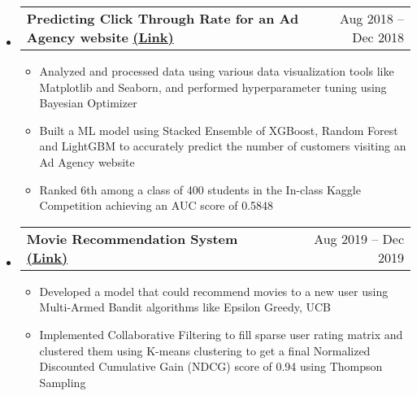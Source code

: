 \documentclass[letterpaper,12pt, margin=2in]{article}
\makeatletter
\newcommand{\resumeItem}[1]{
  \item\small{
    {#1 \vspace{-2pt}}
  }
}
\newcommand{\resumeProjectHeading}[2]{
    \item
    \begin{tabular*}{0.97\textwidth}{l@{\extracolsep{\fill}}r}
      \small#1 & #2 \\
    \end{tabular*}\vspace{-9pt}
}
\newcommand{\resumeSubHeadingListStart}{\begin{itemize}[leftmargin=0.05in, label={}]}
\newcommand{\resumeSubHeadingListEnd}{\end{itemize}}
\newcommand{\resumeItemListStart}{\begin{itemize}}
\newcommand{\resumeItemListEnd}{\end{itemize}\vspace{-8pt}}
\makeatother
\begin{document}
    \resumeSubHeadingListStart
    \resumeProjectHeading
          {\textbf{Predicting Click Through Rate for an Ad Agency website} \href{https://towardsdatascience.com/predicting-click-through-rate-for-a-website-7cd2a892d26e}{\textbf{(Link)}}}{Aug 2018 -- Dec 2018}
          \resumeItemListStart
            \resumeItem{Analyzed and processed data using various data visualization tools like Matplotlib and Seaborn, and performed hyperparameter tuning using Bayesian Optimizer}
            \resumeItem{Built a ML model using Stacked Ensemble of XGBoost, Random Forest and LightGBM to accurately predict the number of customers visiting an Ad Agency website}
            \resumeItem{Ranked 6th among a class of 400 students in the In-class Kaggle Competition achieving an AUC score of 0.5848}
          \resumeItemListEnd
      \resumeProjectHeading
          {\textbf{Movie Recommendation System} \href{https://towardsdatascience.com/solving-cold-user-problem-for-recommendation-system-using-multi-armed-bandit-d36e42fe8d44}{\textbf{(Link)}}}{Aug 2019 -- Dec 2019}
          \resumeItemListStart
            \resumeItem{Developed a model that could recommend movies to a new user using Multi-Armed Bandit algorithms like Epsilon Greedy, UCB}
            \resumeItem{Implemented Collaborative Filtering to fill sparse user rating matrix and clustered them using K-means clustering to get a final Normalized Discounted Cumulative Gain (NDCG) score of 0.94 using Thompson Sampling}
          \resumeItemListEnd
        \resumeSubHeadingListEnd
\end{document}
